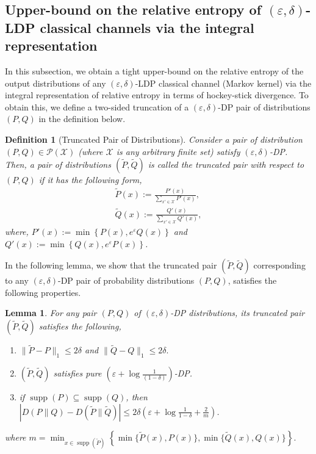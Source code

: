 \documentclass[onecolumn,ldraftcls, 11pt]{IEEEtran}
\newcommand{\supp}{\operatorname{supp}}
\newcommand{\eps}{\varepsilon}
\newcommand*{\cP}{\mathcal{P}}
\newcommand*{\cX}{\mathcal{X}}
\newcommand{\abs}[1]{\left\vert#1\right\vert}
\newtheorem{definition}{Definition}
\newtheorem{lemma}{Lemma}
\begin{document}
\subsection{Upper-bound on the relative entropy of $(\eps,\delta)$-LDP classical channels via the integral representation}
In this subsection,  we obtain a tight upper-bound on the relative entropy of the output distributions of any $(\eps,\delta)$-LDP classical channel (Markov kernel) via the integral representation of relative entropy in terms of hockey-stick divergence. To obtain this, we define a two-sided truncation of a $(\eps,\delta)$-DP pair of distributions $(P,Q)$ in the definition below.

\begin{definition}[Truncated Pair of Distributions]\label{projpair}
   Consider a pair of distribution $(P,Q) \in \cP(\cX)$ (where $\cX$ is any arbitrary finite set) satisfy $(\eps,\delta)$-DP. Then, a pair of distributions $(\tilde{P},\tilde{Q})$ is called the truncated pair with respect to $(P,Q)$ if it has the following form,
   \begin{align}
        \tilde{P}(x) := \frac{P'(x)}{\sum_{x' \in \cX} P'(x)},\label{projpair_eq1} \\
        \tilde{Q}(x) := \frac{Q'(x)}{\sum_{x' \in \cX} Q'(x)},\label{projpair_eq2} 
    \end{align}
    where, $P'(x) := \min\left\{P(x),e^\eps Q(x)\right\}$ and $Q'(x) := \min\left\{Q(x),e^\eps P(x)\right\}$.
\end{definition}


In the following lemma, we show that the truncated pair $(\tilde{P},\tilde{Q})$ corresponding to any $(\eps,\delta)$-DP pair of probability distributions $(P,Q)$, satisfies the following properties.

\begin{lemma}\label{lemma_trunc_prop}
    For any pair $(P,Q)$ of $(\eps,\delta)$-DP distributions, its truncated pair $(\tilde{P},\tilde{Q})$ satisfies the following,
\begin{enumerate}[label=(\roman*)]
    \item $\|\tilde{P}-P\|_1 \leq 2\delta$ and $\|\tilde{Q}-Q\|_1 \leq 2\delta.$
    \item $(\tilde{P},\tilde{Q})$ satisfies pure $\left(\eps+\log\frac{1}{(1-\delta)}\right)$-DP.
    \item if $\supp(P) \subseteq \supp(Q)$, then $\abs{D(P\|Q) -D(\tilde{P}\|\tilde{Q})} \leq 2 \delta \left( \eps + \log \frac{1}{1-\delta} +  \frac{2}{m} \right)$.
\end{enumerate}
 where $m = \min_{x \in \supp(\tilde{P})}\left\{\min\{\tilde{P}(x), P(x)\},\min\{\tilde{Q}(x), Q(x)\}\right\}.$
\end{lemma}
\end{document}
